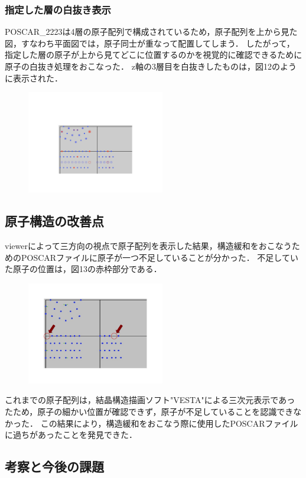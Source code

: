 \subsubsection{指定した層の白抜き表示}
POSCAR\_2223は4層の原子配列で構成されているため，原子配列を上から見た図，すなわち平面図では，原子同士が重なって配置してしまう．
したがって，指定した層の原子が上から見てどこに位置するのかを視覚的に確認できるために原子の白抜き処理をおこなった．
z軸の3層目を白抜きしたものは，図12のように表示された．

\begin{figure}[htbp]\begin{center}
\includegraphics[width=6cm,bb=0 0 442 500]{../figs/./boundary_narita.012.jpg}
\caption{}
\label{default}\end{center}\end{figure}
\subsection{原子構造の改善点}
viewerによって三方向の視点で原子配列を表示した結果，構造緩和をおこなうためのPOSCARファイルに原子が一つ不足していることが分かった．
不足していた原子の位置は，図13の赤枠部分である．

\begin{figure}[htbp]\begin{center}
\includegraphics[width=6cm,bb=0 0 442 500]{../figs/./boundary_narita.013.jpg}
\caption{}
\label{default}\end{center}\end{figure}
これまでの原子配列は，結晶構造描画ソフト"VESTA"による三次元表示であったため，原子の細かい位置が確認できず，原子が不足していることを認識できなかった．
この結果により，構造緩和をおこなう際に使用したPOSCARファイルに過ちがあったことを発見できた．

\subsection{考察と今後の課題}
